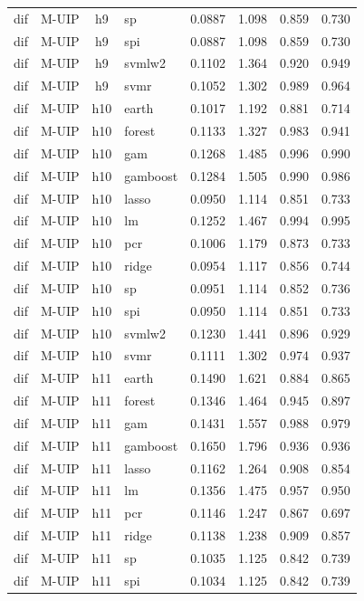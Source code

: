 \begin{ThreePartTable}
\begin{longtable}[t]{llclcccc}
dif & M-UIP & h9 & sp & 0.0887 & 1.098 & 0.859 & 0.730\\
dif & M-UIP & h9 & spi & 0.0887 & 1.098 & 0.859 & 0.730\\
dif & M-UIP & h9 & svmlw2 & 0.1102 & 1.364 & 0.920 & 0.949\\
dif & M-UIP & h9 & svmr & 0.1052 & 1.302 & 0.989 & 0.964\\
\addlinespace
dif & M-UIP & h10 & earth & 0.1017 & 1.192 & 0.881 & 0.714\\
dif & M-UIP & h10 & forest & 0.1133 & 1.327 & 0.983 & 0.941\\
dif & M-UIP & h10 & gam & 0.1268 & 1.485 & 0.996 & 0.990\\
dif & M-UIP & h10 & gamboost & 0.1284 & 1.505 & 0.990 & 0.986\\
dif & M-UIP & h10 & lasso & 0.0950 & 1.114 & 0.851 & 0.733\\
dif & M-UIP & h10 & lm & 0.1252 & 1.467 & 0.994 & 0.995\\
dif & M-UIP & h10 & pcr & 0.1006 & 1.179 & 0.873 & 0.733\\
dif & M-UIP & h10 & ridge & 0.0954 & 1.117 & 0.856 & 0.744\\
dif & M-UIP & h10 & sp & 0.0951 & 1.114 & 0.852 & 0.736\\
dif & M-UIP & h10 & spi & 0.0950 & 1.114 & 0.851 & 0.733\\
dif & M-UIP & h10 & svmlw2 & 0.1230 & 1.441 & 0.896 & 0.929\\
dif & M-UIP & h10 & svmr & 0.1111 & 1.302 & 0.974 & 0.937\\
\addlinespace
dif & M-UIP & h11 & earth & 0.1490 & 1.621 & 0.884 & 0.865\\
dif & M-UIP & h11 & forest & 0.1346 & 1.464 & 0.945 & 0.897\\
dif & M-UIP & h11 & gam & 0.1431 & 1.557 & 0.988 & 0.979\\
dif & M-UIP & h11 & gamboost & 0.1650 & 1.796 & 0.936 & 0.936\\
dif & M-UIP & h11 & lasso & 0.1162 & 1.264 & 0.908 & 0.854\\
dif & M-UIP & h11 & lm & 0.1356 & 1.475 & 0.957 & 0.950\\
dif & M-UIP & h11 & pcr & 0.1146 & 1.247 & 0.867 & 0.697\\
dif & M-UIP & h11 & ridge & 0.1138 & 1.238 & 0.909 & 0.857\\
dif & M-UIP & h11 & sp & 0.1035 & 1.125 & 0.842 & 0.739\\
dif & M-UIP & h11 & spi & 0.1034 & 1.125 & 0.842 & 0.739\\

\end{longtable}
\end{ThreePartTable}
